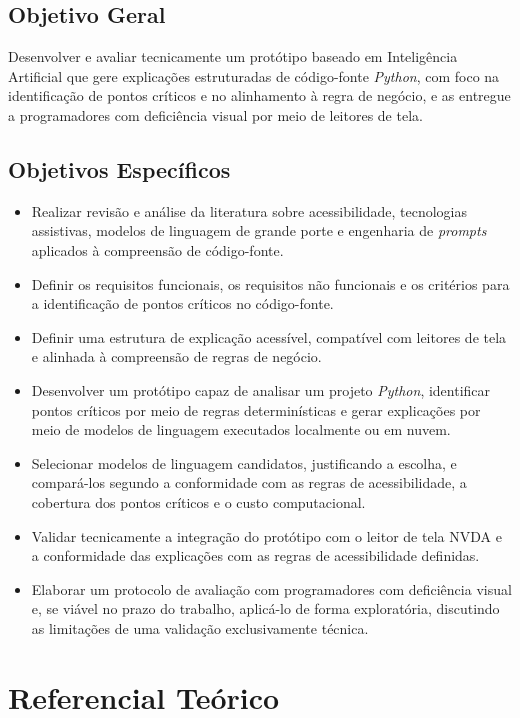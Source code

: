 \documentclass[
    12pt,                   %
    openright,              %
    oneside,                %
    a4paper,                %
    sumario=tradicional,    %
    english,                %
    brazil,                 %
    ]{abntex2}
\begin{document}
\section{Objetivo Geral}\label{sec:objetivos}

Desenvolver e avaliar tecnicamente um protótipo baseado em Inteligência Artificial que gere explicações estruturadas de código-fonte \textit{Python}, com foco na identificação de pontos críticos e no alinhamento à regra de negócio, e as entregue a programadores com deficiência visual por meio de leitores de tela.

\section{Objetivos Específicos}

\begin{itemize}
  \item Realizar revisão e análise da literatura sobre acessibilidade, tecnologias assistivas, modelos de linguagem de grande porte e engenharia de \textit{prompts} aplicados à compreensão de código-fonte.
  \item Definir os requisitos funcionais, os requisitos não funcionais e os critérios para a identificação de pontos críticos no código-fonte.
  \item Definir uma estrutura de explicação acessível, compatível com leitores de tela e alinhada à compreensão de regras de negócio.
  \item Desenvolver um protótipo capaz de analisar um projeto \textit{Python}, identificar pontos críticos por meio de regras determinísticas e gerar explicações por meio de modelos de linguagem executados localmente ou em nuvem.
  \item Selecionar modelos de linguagem candidatos, justificando a escolha, e compará-los segundo a conformidade com as regras de acessibilidade, a cobertura dos pontos críticos e o custo computacional.
  \item Validar tecnicamente a integração do protótipo com o leitor de tela NVDA e a conformidade das explicações com as regras de acessibilidade definidas.
  \item Elaborar um protocolo de avaliação com programadores com deficiência visual e, se viável no prazo do trabalho, aplicá-lo de forma exploratória, discutindo as limitações de uma validação exclusivamente técnica.
\end{itemize}


\chapter{Referencial Teórico}\label{sec:refteorico}
\end{document}
